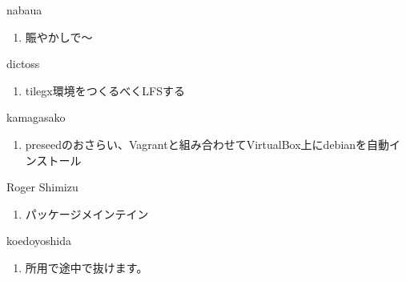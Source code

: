 \begin{prework}{ nabaua }
  \begin{enumerate}
  \item 賑やかしで～
  \end{enumerate}
\end{prework}

\begin{prework}{ dictoss }
  \begin{enumerate}
  \item tilegx環境をつくるべくLFSする
  \end{enumerate}
\end{prework}

\begin{prework}{ kamagasako }
  \begin{enumerate}
  \item preseedのおさらい、Vagrantと組み合わせてVirtualBox上にdebianを自動インストール
  \end{enumerate}
\end{prework}

\begin{prework}{ Roger Shimizu }
  \begin{enumerate}
  \item パッケージメインテイン
  \end{enumerate}
\end{prework}

\begin{prework}{ koedoyoshida }
  \begin{enumerate}
  \item 所用で途中で抜けます。
  \end{enumerate}
\end{prework}
